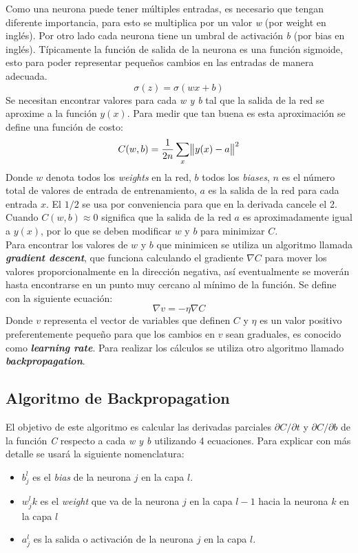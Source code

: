 \documentclass[12pt,spanish]{article}
\begin{document}
	Como una neurona puede tener múltiples entradas, es necesario que tengan diferente importancia, para esto se multiplica por un valor  \textit{w} (por weight en inglés). Por otro lado cada neurona tiene un umbral de activación \textit{b} (por bias en inglés). Típicamente la función de salida de la neurona es una función sigmoide, esto para poder representar pequeños cambios en las entradas de manera adecuada.
	\[ \sigma(z) = \sigma(wx + b) \tag{1}\]
	Se necesitan encontrar valores para cada \textit{w y b} tal que la salida de la red se aproxime a la función $ y(x)$. Para medir que tan buena es esta aproximación se define una función de costo:
	\[ C(w,b) = \frac{1}{2n}\sum\limits_{x} \norm{y(x) - a}^2 \]
	Donde $ w $ denota todos los \textit{weights} en la red, $ b $ todos los \textit{biases}, $ n $ es el número total de valores de entrada de entrenamiento, $ a $ es la salida de la red para cada entrada $ x $. El $ 1/2 $ se usa por conveniencia para que en la derivada cancele el 2. Cuando $ C(w,b) \approx 0 $ significa que la salida de la red $ a $ es aproximadamente igual a $ y(x) $, por lo que se deben modificar $ w $ y $b$ para minimizar $ C $.\\
	Para encontrar los valores de $w$ y $b$ que minimicen se utiliza un algoritmo llamada \textbf{\textit{gradient descent}}, que funciona calculando el gradiente $ \nabla C$ para mover los valores proporcionalmente en la dirección negativa, así eventualmente se moverán hasta encontrarse en un punto muy cercano al mínimo de la función. Se define con la siguiente ecuación:
	\[ \nabla v = -\eta\nabla C \]
	Donde $v$ representa el vector de variables que definen $C$ y $\eta$ es un valor positivo preferentemente pequeño para que los cambios en $v$ sean graduales, es conocido como \textbf{\textit{learning rate}}. Para realizar los cálculos se utiliza otro algoritmo llamado \textbf{\textit{backpropagation}}.
	\subsection{Algoritmo de Backpropagation}
	El objetivo de este algoritmo es calcular las derivadas parciales $ \partial{C}/\partial{t} $ y $ \partial{C}/\partial{b} $ de la función \textit{C} respecto a cada \textit{w y b} utilizando 4 ecuaciones. Para explicar con más detalle se usará la siguiente nomenclatura:
	\begin{itemize}
		\item $b^l_j$ es el \textit{bias} de la neurona $j$ en la capa $l$.
		\item $w^l_jk$ es el \textit{weight} que va de la neurona $j$ en la capa $l-1$ hacia la neurona $k$ en la capa $l$
		\item $a^l_j$ es la salida o activación de la neurona $j$ en la capa $l$.
	\end{itemize}
\end{document}

